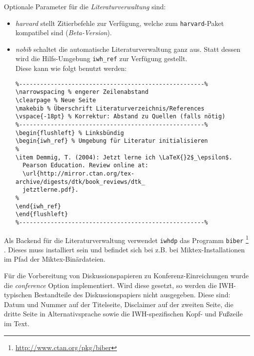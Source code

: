 \documentclass[german]{iwhdp}
\begin{document}
Optionale Parameter für die \textit{Literaturverwaltung} sind:
%
\begin{itemize}
\item \emph{harvard} stellt Zitierbefehle zur Verfügung, welche zum \texttt{harvard}-Paket kompatibel sind (\emph{Beta-Version}).
\item \emph{nobib} schaltet die automatische Literaturverwaltung ganz aus.
Statt dessen wird die Hilfs-Umgebung \texttt{iwh\_ref} zur Verfügung gestellt.\\ 
Diese kann wie folgt benutzt werden:

{\small {}
\begin{verbatim}
%-----------------------------------------------------%
\narrowspacing % engerer Zeilenabstand
\clearpage % Neue Seite
\makebib % Überschrift Literaturverzeichnis/References
\vspace{-18pt} % Korrektur: Abstand zu Quellen (falls nötig)
%-----------------------------------------------------%
\begin{flushleft} % Linksbündig
\begin{iwh_ref} % Umgebung für Literatur initialisieren
%
\item Demmig, T. (2004): Jetzt lerne ich \LaTeX{}2$_\epsilon$. 
  Pearson Education. Review online at: 
  \url{http://mirror.ctan.org/tex-archive/digests/dtk/book_reviews/dtk_ 
  jetztlerne.pdf}.
%
\end{iwh_ref}
\end{flushleft}
%-----------------------------------------------------%
\end{verbatim}
} %
%
\end{itemize}

Als Backend für die Literaturverwaltung verwendet \texttt{iwhdp} das Programm \texttt{biber}%
\footnote{\url{http://www.ctan.org/pkg/biber}}%
. Dieses muss installiert sein und befindet sich bei z.B. bei Miktex-Installationen im Pfad der Miktex-Binärdateien.

Für die Vorbereitung von Diskussionspapieren zu Konferenz-Einreichungen wurde die \emph{conference} Option implementiert.
Wird diese gesetzt, so werden die IWH-typischen Bestandteile des Diskussionspapiers nicht ausgegeben.
Diese sind: Datum und Nummer auf der Titelseite, Disclaimer auf der zweiten Seite, die dritte Seite in Alternativsprache sowie die IWH-spezifischen Kopf- und Fußzeile im Text.
\end{document}
